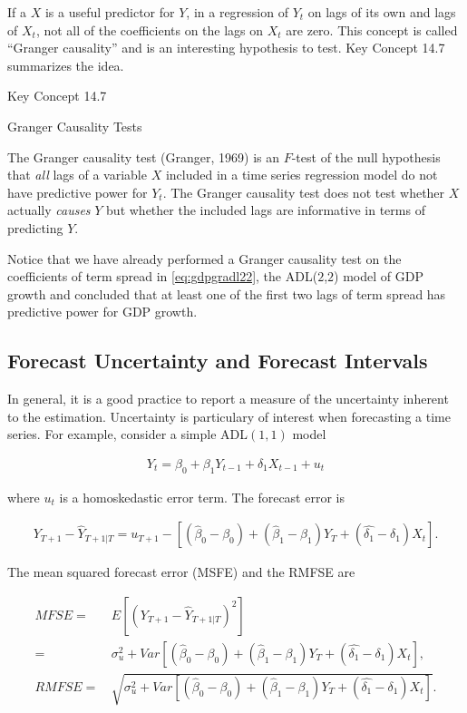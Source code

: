 \documentclass[]{book}
\theoremstyle{definition}
\theoremstyle{definition}
\theoremstyle{definition}
\theoremstyle{remark}
\begin{document}
If a \(X\) is a useful predictor for \(Y\), in a regression of \(Y_t\)
on lags of its own and lags of \(X_t\), not all of the coefficients on
the lags on \(X_t\) are zero. This concept is called ``Granger
causality'' and is an interesting hypothesis to test. Key Concept 14.7
summarizes the idea.

Key Concept 14.7

Granger Causality Tests

The Granger causality test (Granger, 1969) is an \(F\)-test of the null
hypothesis that \emph{all} lags of a variable \(X\) included in a time
series regression model do not have predictive power for \(Y_t\). The
Granger causality test does not test whether \(X\) actually
\emph{causes} \(Y\) but whether the included lags are informative in
terms of predicting \(Y\).

Notice that we have already performed a Granger causality test on the
coefficients of term spread in \eqref{eq:gdpgradl22}, the ADL(\(2\),\(2\))
model of GDP growth and concluded that at least one of the first two
lags of term spread has predictive power for GDP growth.

\subsection*{Forecast Uncertainty and Forecast
Intervals}\label{forecast-uncertainty-and-forecast-intervals}

In general, it is a good practice to report a measure of the uncertainty
inherent to the estimation. Uncertainty is particulary of interest when
forecasting a time series. For example, consider a simple ADL\((1,1)\)
model

\begin{align*}
  Y_t = \beta_0 + \beta_1 Y_{t-1} + \delta_1 X_{t-1} + u_t
\end{align*}

where \(u_t\) is a homoskedastic error term. The forecast error is

\begin{align*}
  Y_{T+1} - \widehat{Y}_{T+1\vert T} = u_{T+1} - \left[(\widehat{\beta}_0 - \beta_0) + (\widehat{\beta}_1 - \beta_1) Y_T + (\widehat{\delta_1} - \delta_1) X_t \right].
\end{align*}

The mean squared forecast error (MSFE) and the RMFSE are

\begin{align*}
  MFSE =& \, E\left[(Y_{T+1} - \widehat{Y}_{T+1\vert T})^2 \right] \\
       =& \, \sigma_u^2 + Var\left[ (\widehat{\beta}_0 - \beta_0) + (\widehat{\beta}_1 - \beta_1) Y_T + (\widehat{\delta_1} - \delta_1) X_t \right], \\
  RMFSE =& \, \sqrt{\sigma_u^2 + Var\left[ (\widehat{\beta}_0 - \beta_0) + (\widehat{\beta}_1 - \beta_1) Y_T + (\widehat{\delta_1} - \delta_1) X_t \right]}.
\end{align*}
\end{document}
